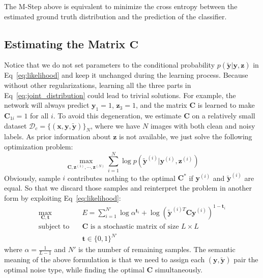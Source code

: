 \documentclass[10pt,twocolumn,letterpaper]{article}
\def\vec{\mathbf}
\def\mat{\mathbf}
\begin{document}
The M-Step above is equivalent to minimize the cross entropy between the estimated ground truth distribution and the prediction of the classifier.

\subsection{Estimating the Matrix $\mat{C}$} %
\label{sub:confusion_estimation}
Notice that we do not set parameters to the conditional probability $p(\tilde{\vec{y}}|\vec{y},\vec{z})$ in Eq~\eqref{eq:likelihood} and keep it unchanged during the learning process. Because without other regularizations, learning all the three parts in Eq~\eqref{eq:joint_distribution} could lead to trivial solutions. For example, the network will always predict $\vec{y}_1 = 1$, $\vec{z}_3 = 1$, and the matrix $\mat{C}$ is learned to make $\mat{C}_{1i} = 1$ for all $i$. To avoid this degeneration, we estimate $\mat{C}$ on a relatively small dataset $\mathcal{D}_c = \{(\vec{x},\vec{y},\tilde{\vec{y}})\}_N$, where we have $N$ images with both clean and noisy labels. As prior information about $\vec{z}$ is not available, we just solve the following optimization problem:
\begin{equation} \label{eq:opt_all}
    \max_{\mat{C},\vec{z}^{(1)},\cdots,\vec{z}^{(N)}} \sum_{i=1}^N \log p(\tilde{\vec{y}}^{(i)}|\vec{y}^{(i)},\vec{z}^{(i)})
\end{equation}
Obviously, sample $i$ contributes nothing to the optimal $\mat{C}^*$ if $\vec{y}^{(i)}$ and $\tilde{\vec{y}}^{(i)}$ are equal. So that we discard those samples and reinterpret the problem in another form by exploiting Eq~\ref{eq:likelihood}:
\begin{equation}
\begin{aligned}
\max_{\mat{C},\vec{t}} \quad & E=\sum_{i=1}^{N'} \log \alpha^{\vec{t}_i} + \log (\tilde{\vec{y}}^{(i)T} \mat{C} \vec{y}^{(i)})^{1-\vec{t}_i}\\
\text{subject to} \quad & \mat{C} \text{ is a stochastic matrix of size } L\times L \\
                    & \vec{t} \in \{0,1\}^{N'}
\end{aligned}
\end{equation}
where $\alpha=\frac{1}{L-1}$ and $N'$ is the number of remaining samples. The semantic meaning of the above formulation is that we need to assign each $(\vec{y},\tilde{\vec{y}})$ pair the optimal noise type, while finding the optimal $\mat{C}$ simultaneously.
\end{document}
